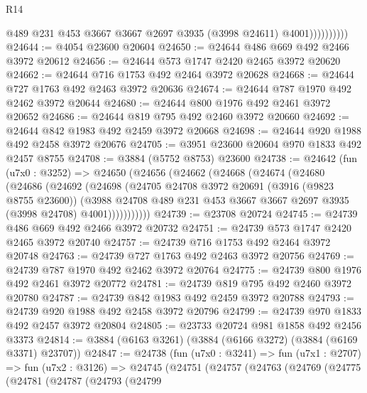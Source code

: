 \begin{lexlean}{R14}
\begin{coremodule}
                        @489
                        @231
                        @453
                        @3667
                        @3667
                        @2697
                        @3935
                        (@3998 @24611)
                        @4001))))))))))
@24644 := @4054 @23600 @20604
@24650 := @24644 @486 @669 @492 @2466 @3972 @20612
@24656 := @24644 @573 @1747 @2420 @2465 @3972 @20620
@24662 := @24644 @716 @1753 @492 @2464 @3972 @20628
@24668 := @24644 @727 @1763 @492 @2463 @3972 @20636
@24674 := @24644 @787 @1970 @492 @2462 @3972 @20644
@24680 := @24644 @800 @1976 @492 @2461 @3972 @20652
@24686 := @24644 @819 @795 @492 @2460 @3972 @20660
@24692 := @24644 @842 @1983 @492 @2459 @3972 @20668
@24698 := @24644 @920 @1988 @492 @2458 @3972 @20676
@24705 := @3951 @23600 @20604 @970 @1833 @492 @2457 @8755
@24708 := @3884 (@5752 @8753) @23600
@24738 := @24642
    (fun (u7x0 : @3252) =>
    @24650
      (@24656
        (@24662
          (@24668
            (@24674
              (@24680
                (@24686
                  (@24692
                    (@24698
                      (@24705
                        @24708
                        @3972
                        @20691
                        (@3916 (@9823 @8755 @23600))
                        (@3988
                          @24708
                          @489
                          @231
                          @453
                          @3667
                          @3667
                          @2697
                          @3935
                          (@3998 @24708)
                          @4001)))))))))))
@24739 := @23708 @20724
@24745 := @24739 @486 @669 @492 @2466 @3972 @20732
@24751 := @24739 @573 @1747 @2420 @2465 @3972 @20740
@24757 := @24739 @716 @1753 @492 @2464 @3972 @20748
@24763 := @24739 @727 @1763 @492 @2463 @3972 @20756
@24769 := @24739 @787 @1970 @492 @2462 @3972 @20764
@24775 := @24739 @800 @1976 @492 @2461 @3972 @20772
@24781 := @24739 @819 @795 @492 @2460 @3972 @20780
@24787 := @24739 @842 @1983 @492 @2459 @3972 @20788
@24793 := @24739 @920 @1988 @492 @2458 @3972 @20796
@24799 := @24739 @970 @1833 @492 @2457 @3972 @20804
@24805 := @23733 @20724 @981 @1858 @492 @2456 @3373
@24814 := @3884 (@6163 @3261) (@3884 (@6166 @3272) (@3884 (@6169 @3371) @23707))
@24847 := @24738
    (fun (u7x0 : @3241) =>
    fun (u7x1 : @2707) =>
    fun (u7x2 : @3126) =>
    @24745
      (@24751
        (@24757
          (@24763
            (@24769
              (@24775
                (@24781
                  (@24787
                    (@24793
                      (@24799

\end{coremodule}
\end{lexlean}
